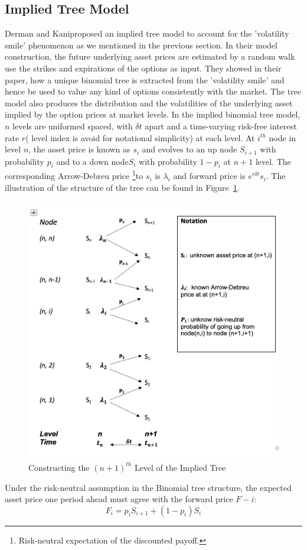 \subsection{Implied Tree Model}
Derman and Kani\parencite{Derman1994}proposed an implied tree model to account for the 'volatility smile' phenomenon as we mentioned in the previous section. In their model construction, the future underlying asset prices are estimated by a random walk use the strikes and expirations of the options as input. They showed in their paper, how a unique binomial tree is extracted from the 'volatility smile' and hence be used to value any kind of options consistently with the market. The tree model also produces the distribution and the volatilities of the underlying asset implied by the option prices at market levels. 
In the implied binomial tree model, $n$ levels are uniformed spaced, with $\delta t$ apart and a time-varying risk-free interest rate $r$( level index is avoid for notational simplicity) at each level. At $i^{th}$ node in level $n$, the asset price is known as $s_i$ and evolves to an up node $S_{i+1}$ with probability $p_i$ and to a down node$S_i$ with probability $1-p_i$ at $n+1$ level. The corresponding Arrow-Debreu price \footnote{ Risk-neutral expectation of the discounted payoff.}to $s_i$ is $\lambda_i$ and forward price is $e^{r\delta t}s_i$. The illustration of the structure of the tree can be found in Figure~\ref{fig:tree}.
\begin{figure}
\centering
\includegraphics[width=0.5\columnwidth]{Figures/tree}
\decoRule
\caption{Constructing the $(n+1)^{th}$ Level of the Implied Tree}
\label{fig:tree}
\end{figure}
Under the risk-neutral assumption in the Binomial tree structure, the expected asset price one period ahead must agree with the forward price $F-i$:
\begin{equation}
\label{eqn:foward}
F_i = p_i S_{i+1} +(1-p_i)S_{i}
\end{equation}

